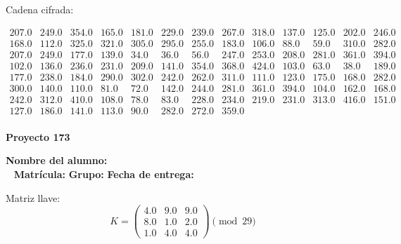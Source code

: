 \documentclass[12pt]{article}
\begin{document}
Cadena cifrada:
\begin{center}
$\begin{array}{lllllllllllll}
207.0 & 249.0 & 354.0 & 165.0 & 181.0 & 229.0 & 239.0 & 267.0 & 318.0 & 137.0 & 125.0 & 202.0 & 246.0\\
168.0 & 112.0 & 325.0 & 321.0 & 305.0 & 295.0 & 255.0 & 183.0 & 106.0 & 88.0 & 59.0 & 310.0 & 282.0\\
207.0 & 249.0 & 177.0 & 139.0 & 34.0 & 36.0 & 56.0 & 247.0 & 253.0 & 208.0 & 281.0 & 361.0 & 394.0\\
102.0 & 136.0 & 236.0 & 231.0 & 209.0 & 141.0 & 354.0 & 368.0 & 424.0 & 103.0 & 63.0 & 38.0 & 189.0\\
177.0 & 238.0 & 184.0 & 290.0 & 302.0 & 242.0 & 262.0 & 311.0 & 111.0 & 123.0 & 175.0 & 168.0 & 282.0\\
300.0 & 140.0 & 110.0 & 81.0 & 72.0 & 142.0 & 244.0 & 281.0 & 361.0 & 394.0 & 104.0 & 162.0 & 168.0\\
242.0 & 312.0 & 410.0 & 108.0 & 78.0 & 83.0 & 228.0 & 234.0 & 219.0 & 231.0 & 313.0 & 416.0 & 151.0\\
127.0 & 186.0 & 141.0 & 113.0 & 90.0 & 282.0 & 272.0 & 359.0\\
\end{array}$
\end{center}

\newpage


\textbf{Proyecto 173}

\textbf{Nombre del alumno:} \underline{\hspace{13cm}}\\\
\vspace{1cm}
\textbf{Matrícula:} \underline{\hspace{4cm}} \hspace{1cm}
\textbf{Grupo:} \underline{\hspace{2cm}}
\textbf{Fecha de entrega:} \underline{\hspace{2cm}}

\medskip

Matriz llave:
\[
K = \begin{pmatrix}
4.0 & 9.0 & 9.0\\
8.0 & 1.0 & 2.0\\
1.0 & 4.0 & 4.0
\end{pmatrix} \pmod{29}
\]
\end{document}
